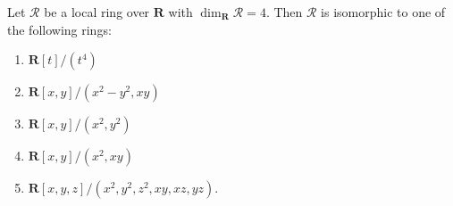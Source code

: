 Let $\mathcal{R}$ be a local ring over $\mathbf{R}$ with $\dim_{\mathbf{R}} \mathcal{R} = 4$. Then $\mathcal{R}$ is isomorphic to one of the following rings:
\begin{enumerate}
\item $\mathbf{R}[t]/(t^4)$
\item $\mathbf{R}[x, y]/(x^2 - y^2, xy)$
\item $\mathbf{R}[x, y]/(x^2, y^2)$
\item $\mathbf{R}[x, y]/(x^2, xy)$
\item $\mathbf{R}[x, y, z]/(x^2, y^2, z^2, xy, xz, yz)$.
\end{enumerate}
